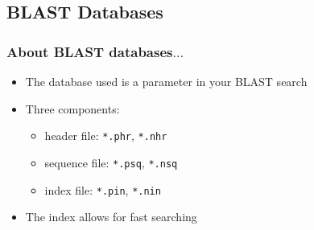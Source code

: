 %

\subsection{BLAST Databases}
\begin{frame}
  \frametitle{About BLAST databases$\ldots$}
  \begin{itemize}
    \item The database used is a parameter in your BLAST search
    \item Three components:
    \begin{itemize}
      \item header file: \texttt{*.phr}, \texttt{*.nhr}
      \item sequence file: \texttt{*.psq}, \texttt{*.nsq}
      \item index file: \texttt{*.pin}, \texttt{*.nin}
    \end{itemize}
    \item The index allows for fast searching                
  \end{itemize}
\end{frame}